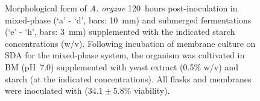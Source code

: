 \begin{figure}[tb]
\hspace{0.25cm}
\hspace{0.25cm}
  \caption{Morphological form of \emph{A. oryzae} 120~hours post-inoculation in mixed-phase (\lq a' - \lq d', bars: 10~mm) and submerged fermentations (\lq e' - \lq h', bars: 3~mm) supplemented with the indicated starch concentrations (w/v). Following incubation of membrane culture on SDA for the mixed-phase system, the organism was cultivated in BM (pH~7.0) supplemented with yeast extract (0.5\% w/v) and starch (at the indicated concentrations). All flasks and membranes were inoculated with  ($34.1 \pm 5.8$\% viability).}
  \label{fig:VaryCMorph}
\end{figure}

